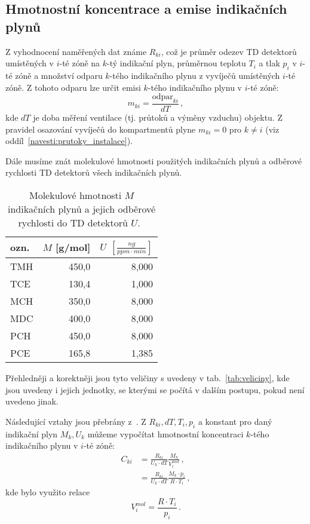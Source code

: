\subsection{Hmotnostní koncentrace a emise indikačních plynů}
Z vyhodnocení naměřených dat známe $R_{ki}$, což je průměr odezev TD detektorů umístěných v $i$-té zóně na $k$-tý indikační plyn, průměrnou teplotu $T_i$ a tlak $p_i$ v $i$-té zóně a množství odparu $k$-tého indikačního plynu z vyvíječů umístěných $i$-té zóně. Z tohoto odparu lze určit emisi $k$-tého indikačního plynu v $i$-té zóně:
\begin{equation}
    m_{ki}=\frac{\text{odpar}_{ki}}{dT}\,,
    \label{eq:prutoky_emise}
\end{equation}
kde $dT$ je doba měření ventilace (tj. průtoků a výměny vzduchu) objektu. Z pravidel osazování vyvíječů do kompartmentů plyne $m_{ki}=0$ pro $k\neq i$ (viz oddíl~\ref{navesti:prutoky_instalace}). 

Dále musíme znát molekulové hmotnosti použitých indikačních plynů a odběrové rychlosti TD detektorů všech indikačních plynů.

\begin{table}[ht]
    \centering
    \caption{Molekulové hmotnosti $M$ indikačních plynů a jejich odběrové rychlosti do TD detektorů $U$.~\cite{metodika}}
    \label{tab:prutoky_plyny_konstanty}
    \begin{tabular}{lrr}
        \toprule
ozn. & $M$ [g/mol] & $U$ $\left[\si{\frac{ng}{ppm\cdot min}}\right]$\\
\midrule
TMH & 450,0 &  8,000 \\
TCE & 130,4 &  1,000 \\
MCH & 350,0 &  8,000 \\
MDC & 400,0 &  8,000 \\
PCH & 450,0 &  8,000 \\
PCE & 165,8 &  1,385 \\
\bottomrule
    \end{tabular}
\end{table}

Přehledněji a korektněji jsou tyto veličiny s uvedeny v tab.~\ref{tab:veliciny}, kde jsou uvedeny i jejich jednotky, se kterými se počítá v dalším postupu, pokud není uvedeno jinak.

Následující vztahy jsou přebrány z~\cite{metodika}. Z $R_{ki}, dT, T_i, p_i$ a konstant pro daný indikační plyn $M_k, U_k$ můžeme vypočítat hmotnostní koncentraci $k$-tého indikačního plynu v $i$-té zóně:
\begin{align}
    C_{ki}&=\frac{R_{ki}}{U_k\cdot dT}\frac{M_k}{V_{i}^{mol}}\,,\\
    &=\frac{R_{ki}}{U_k\cdot dT}\frac{M_k\cdot p_i}{R\cdot T_i}\,,
\end{align}
kde bylo využito relace
\begin{equation}
    V^{mol}_{i}=\frac{R\cdot T_i}{p_i}\,.
    \label{eq:prutoky_molarniObjem}
\end{equation}

